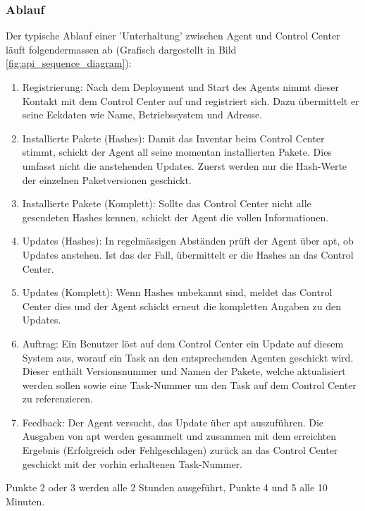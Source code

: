 \subsubsection*{Ablauf}

Der typische Ablauf einer 'Unterhaltung' zwischen Agent und Control Center läuft folgendermassen ab (Grafisch dargestellt in Bild \ref{fig:api_sequence_diagram}):

\begin{enumerate}
    \item Registrierung: Nach dem Deployment und Start des Agents nimmt dieser Kontakt mit dem Control Center auf und registriert sich. Dazu übermittelt er seine Eckdaten wie Name, Betriebssystem und Adresse.
    \item Installierte Pakete (Hashes): Damit das Inventar beim Control Center stimmt, schickt der Agent all seine momentan installierten Pakete. Dies umfasst nicht die anstehenden Updates. Zuerst werden nur die Hash-Werte der einzelnen Paketversionen geschickt.
    \item Installierte Pakete (Komplett): Sollte das Control Center nicht alle gesendeten Hashes kennen, schickt der Agent die vollen Informationen.
    \item Updates (Hashes): In regelmässigen Abständen prüft der Agent über \gls{apt}, ob Updates anstehen. Ist das der Fall, übermittelt er die Hashes an das Control Center.
    \item Updates (Komplett): Wenn Hashes unbekannt sind, meldet das Control Center dies und der Agent schickt erneut die kompletten Angaben zu den Updates.
    \item Auftrag: Ein Benutzer löst auf dem Control Center ein Update auf diesem System aus, worauf ein Task an den entsprechenden Agenten geschickt wird. Dieser enthält Versionsnummer und Namen der Pakete, welche aktualisiert werden sollen sowie eine Task-Nummer um den Task auf dem Control Center zu referenzieren.
    \item Feedback: Der Agent versucht, das Update über \gls{apt} auszuführen. Die Ausgaben von apt werden gesammelt und zusammen mit dem erreichten Ergebnis (Erfolgreich oder Fehlgeschlagen) zurück an das Control Center geschickt mit der vorhin erhaltenen Task-Nummer.
\end{enumerate}

Punkte 2 oder 3 werden alle 2 Stunden ausgeführt, Punkte 4 und 5 alle 10 Minuten.